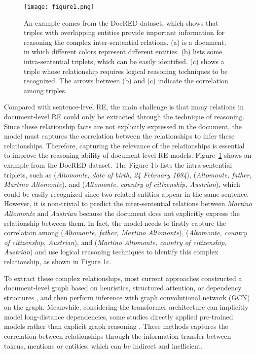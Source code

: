 \documentclass[11pt]{article}
\begin{document}
\begin{figure}[t]
\centering
\texttt{[image: figure1.png]} \caption{An example comes from the DocRED dataset, which shows that triples with overlapping entities provide important information for reasoning the complex inter-sentential relations. (a) is a document, in which different colors represent different entities. (b) lists some intra-sentential triplets, which can be easily identified. (c) shows a triple whose relationship requires logical reasoning techniques to be recognized. The arrows between (b) and (c) indicate the correlation among triples.}
\label{fig1}
\end{figure}

Compared with sentence-level RE, the main challenge is that many relations in document-level RE could only be extracted through the technique of reasoning.
Since these relationship facts are not explicitly expressed in the document, the model must captures the correlation between the relationships to infer these relationships.
Therefore, capturing the relevance of  the relationships is essential to improve the reasoning ability of document-level RE models.
Figure~\ref{fig1} shows an example from the DocRED dataset. The Figure 1b lists the intra-sentential triplets, such as (\textit{Altomonte, date of birth, 24 February 1694}), (\textit{Altomonte, father, Martino Altomonte}), and (\textit{Altomonte, country of citizenship, Austrian}), which could be easily recognized since two related entities appear in the same sentence. 
However, it is non-trivial to predict the inter-sentential relations between \textit{Martino Altomonte} and \textit{Austrian} because the document does not explicitly express the relationship between them. 
In fact, the model needs to firstly capture the correlation among (\textit{Altomonte, father, Martino Altomonte}), (\textit{Altomonte, country of citizenship, Austrian}), and (\textit{Martino Altomonte, country of citizenship, Austrian}) and use logical reasoning techniques to identify this complex relationship, as shown in Figure 1c.

To extract these complex relationships, most current approaches constructed a document-level graph based on heuristics, structured attention, or dependency structures \cite{c:105,c:106,c:107,c:108}, and then perform inference with graph convolutional network (GCN) \cite{c:109,c:110} on the graph. Meanwhile, considering the transformer architecture can implicitly model long-distance dependencies, some studies \cite{c:111,c:112} directly applied pre-trained models rather than explicit graph reasoning \cite{c:113}. 
These methods captures the correlation between relationships through the information transfer between tokens, mentions or entities, which can be indirect and inefficient.
\end{document}
